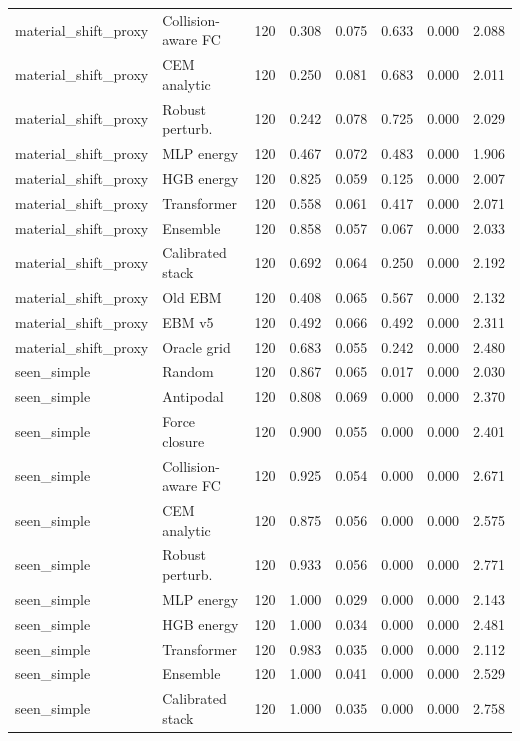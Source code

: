 {\begin{longtable}{llrrrrrr}
material\_shift\_proxy & Collision-aware FC & 120 & 0.308 & 0.075 & 0.633 & 0.000 & 2.088 \\
material\_shift\_proxy & CEM analytic & 120 & 0.250 & 0.081 & 0.683 & 0.000 & 2.011 \\
material\_shift\_proxy & Robust perturb. & 120 & 0.242 & 0.078 & 0.725 & 0.000 & 2.029 \\
material\_shift\_proxy & MLP energy & 120 & 0.467 & 0.072 & 0.483 & 0.000 & 1.906 \\
material\_shift\_proxy & HGB energy & 120 & 0.825 & 0.059 & 0.125 & 0.000 & 2.007 \\
material\_shift\_proxy & Transformer & 120 & 0.558 & 0.061 & 0.417 & 0.000 & 2.071 \\
material\_shift\_proxy & Ensemble & 120 & 0.858 & 0.057 & 0.067 & 0.000 & 2.033 \\
material\_shift\_proxy & Calibrated stack & 120 & 0.692 & 0.064 & 0.250 & 0.000 & 2.192 \\
material\_shift\_proxy & Old EBM & 120 & 0.408 & 0.065 & 0.567 & 0.000 & 2.132 \\
material\_shift\_proxy & EBM v5 & 120 & 0.492 & 0.066 & 0.492 & 0.000 & 2.311 \\
material\_shift\_proxy & Oracle grid & 120 & 0.683 & 0.055 & 0.242 & 0.000 & 2.480 \\
seen\_simple & Random & 120 & 0.867 & 0.065 & 0.017 & 0.000 & 2.030 \\
seen\_simple & Antipodal & 120 & 0.808 & 0.069 & 0.000 & 0.000 & 2.370 \\
seen\_simple & Force closure & 120 & 0.900 & 0.055 & 0.000 & 0.000 & 2.401 \\
seen\_simple & Collision-aware FC & 120 & 0.925 & 0.054 & 0.000 & 0.000 & 2.671 \\
seen\_simple & CEM analytic & 120 & 0.875 & 0.056 & 0.000 & 0.000 & 2.575 \\
seen\_simple & Robust perturb. & 120 & 0.933 & 0.056 & 0.000 & 0.000 & 2.771 \\
seen\_simple & MLP energy & 120 & 1.000 & 0.029 & 0.000 & 0.000 & 2.143 \\
seen\_simple & HGB energy & 120 & 1.000 & 0.034 & 0.000 & 0.000 & 2.481 \\
seen\_simple & Transformer & 120 & 0.983 & 0.035 & 0.000 & 0.000 & 2.112 \\
seen\_simple & Ensemble & 120 & 1.000 & 0.041 & 0.000 & 0.000 & 2.529 \\
seen\_simple & Calibrated stack & 120 & 1.000 & 0.035 & 0.000 & 0.000 & 2.758 \\

\end{longtable}}
